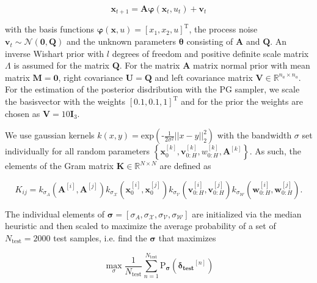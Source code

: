 \begin{equation} \label{State transition}
\boldsymbol{x}_{t+1} = \boldsymbol{A} \boldsymbol{\varphi}(\boldsymbol{x}_t, u_t) + \boldsymbol{v}_{t}
\end{equation}

with the basis functions $\boldsymbol{\varphi} (\boldsymbol{x}, u) = \left[ x_1,  x_2,  u \right]^\text{T}$, the process noise $\boldsymbol{v}_{t} \sim \mathcal{N} (\boldsymbol{0}, \boldsymbol{Q})$ and the unknown parameters $\boldsymbol{\theta}$ consisting of $\boldsymbol{A}$ and $\boldsymbol{Q}$. An inverse Wishart  prior with $l$ degrees of freedom and positive definite scale matrix $\Lambda$ is assumed for the matrix $\boldsymbol{Q}$. For the matrix $\boldsymbol{A}$ matrix normal prior with mean matrix $\boldsymbol{M} = \boldsymbol{0}$, right covariance $\boldsymbol{U} = \boldsymbol{Q}$ and left covariance matrix $\boldsymbol{V} \in \mathbb{R}^{n_a \times n_a}.$ For the estimation of the posterior disdribution with the PG sampler, we scale the basisvector with the weights $\left[ 0.1,  0.1,  1 \right]^\text{T}$ and for the prior the weights are chosen as $\boldsymbol{V} = 10 \boldsymbol{I}_3$.

We use gaussian kernels $k(x,y) = \text{exp}\left(\text{-}\frac{1}{2\sigma^2} ||x - y||_2^2 \right)$ with the bandwidth $\sigma$ set individually for all random parameters $\left\{\boldsymbol{x}_0^{[k]}, \boldsymbol{v}_{0:H}^{[k]}, w_{0:H}^{[k]},  \boldsymbol{A}^{[k]}\right\}$. As such, the elements of the Gram matrix $\boldsymbol{K} \in \mathbb{R}^{N \times N }$ are defined as

\begin{equation} \label{Kernel equation}
K_{ij} = k_{\sigma_A}(\boldsymbol{A}^{[i]}, \boldsymbol{A}^{[j]})  k_{\sigma_\mathcal{X}}(\boldsymbol{x}_0^{[i]}, \boldsymbol{x}_0^{[j]})    k_{\sigma_\mathcal{V}}(\boldsymbol{v}_{0:H}^{[i]}, \boldsymbol{v}_{0:H}^{[j]})  k_{\sigma_\mathcal{W}}(\boldsymbol{w}_{0:H}^{[i]}, \boldsymbol{w}_{0:H}^{[j]}).
\end{equation}

The individual elements of $\boldsymbol{\sigma} = [\sigma_A, \sigma_\mathcal{X}, \sigma_\mathcal{V}, \sigma_\mathcal{W}]$ are initialized via the median heuristic \cite{Damien_18} and then scaled to maximize the average probability of a set of $N_\text{test} = 2000$ test samples, i.e. find the $\boldsymbol{\sigma}$ that maximizes

 \begin{equation} \label{Average Probability}
\max\limits_{\sigma} \frac{1}{N_\text{test}}  \sum_{n= 1}^{N_\text{test}} \text{P}_{\boldsymbol{\sigma}} ( \boldsymbol{\delta_\text{test}}^{[n]} )
\end{equation}

